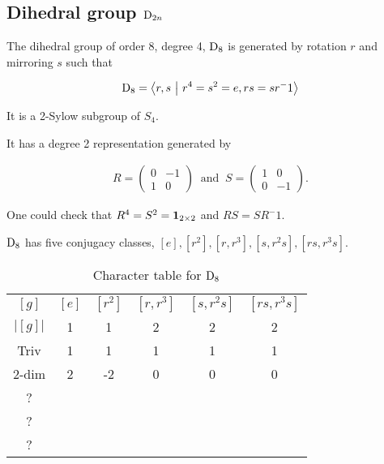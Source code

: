 		
	\subsection{Dihedral group $\text{D}_{2n}$}
	
		The dihedral group of order 8, degree 4, $\text{D}_8$ is generated by rotation $r$ and mirroring $s$ such that
		
		\begin{align}
			\text{D}_8 = \left\langle r, s \ \middle\vert \ r^4 = s^2 = e, rs = sr^-1 \right\rangle
		\end{align}
		
		It is a 2-Sylow subgroup of $S_4$.
		
		It has a degree 2 representation generated by
		
		\begin{align}
			R = \begin{pmatrix}
				0 & -1 \\
				1 & 0 
			\end{pmatrix} \ \text{ and } \ S = \begin{pmatrix}
			1 & 0 \\
			0 & -1 
			\end{pmatrix}.
		\end{align}
		
		One could check that $R^4 = S^2 = \mathbf{1}_{2 \times 2}$ and $RS = SR^-1$.
		
		$\text{D}_8$ has five conjugacy classes, $[e], [r^2], [r, r^3], [s, r^2s], [rs, r^3s]$.
		
		\begin{table}[hbt!]\caption{Character table for $\text{D}_8$}\centering
			\begin{tabular}{c | c c c c c }
				 $[g]$  & $[e]$ & $[r^2]$ & $[r, r^3]$ & $[s, r^2s]$ & $[rs, r^3s]$ \\
				$|[g]|$ & 1     & 1       & 2          & 2           & 2            \\ \hline
				 Triv   & 1     & 1       & 1          & 1           & 1            \\
				 2-dim  & 2     & -2      & 0          & 0           & 0            \\
				     ?  &       &         &            &             &              \\
				     ?  &       &         &            &             &              \\
				     ?  &       &         &            &             &
			\end{tabular}
		\end{table}
		
		
			
			